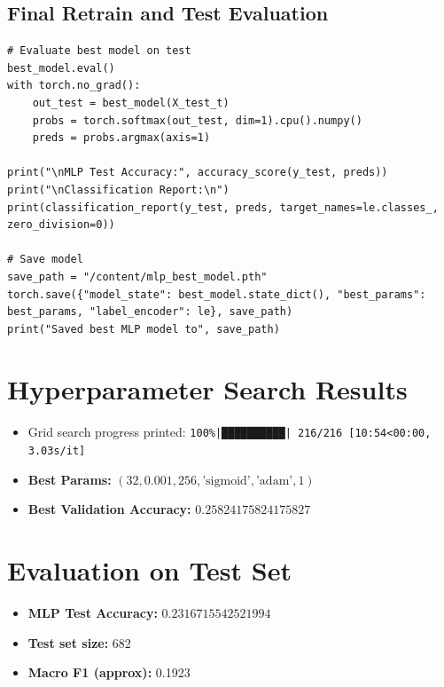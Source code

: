 \documentclass[11pt,a4paper]{article}
\begin{document}
\subsection{Final Retrain and Test Evaluation}
\begin{lstlisting}[caption={Retrain on train+val, evaluate on test, save model}]
# Evaluate best model on test
best_model.eval()
with torch.no_grad():
    out_test = best_model(X_test_t)
    probs = torch.softmax(out_test, dim=1).cpu().numpy()
    preds = probs.argmax(axis=1)

print("\nMLP Test Accuracy:", accuracy_score(y_test, preds))
print("\nClassification Report:\n")
print(classification_report(y_test, preds, target_names=le.classes_, zero_division=0))

# Save model
save_path = "/content/mlp_best_model.pth"
torch.save({"model_state": best_model.state_dict(), "best_params": best_params, "label_encoder": le}, save_path)
print("Saved best MLP model to", save_path)
\end{lstlisting}

\section{Hyperparameter Search Results}
\begin{itemize}
  \item Grid search progress printed: \texttt{100\%|██████████| 216/216 [10:54<00:00,  3.03s/it]}
  \item \textbf{Best Params:} \((32, 0.001, 256, \text{'sigmoid'}, \text{'adam'}, 1)\)
  \item \textbf{Best Validation Accuracy:} \(\mathbf{0.25824175824175827}\)
\end{itemize}

\section{Evaluation on Test Set}
\begin{itemize}
  \item \textbf{MLP Test Accuracy:} \(\mathbf{0.2316715542521994}\)
  \item \textbf{Test set size:} 682
  \item \textbf{Macro F1 (approx):} 0.1923
\end{itemize}
\end{document}
